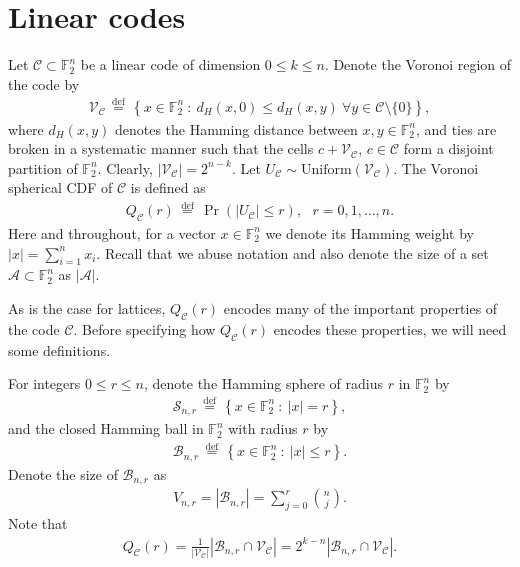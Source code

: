 \documentclass[article,doublecolumn]{IEEEtran}
\newcommand{\F}{{\mathbb{F}}}
\newcommand{\df}{{\, \stackrel{\mathrm{def}}{=}\, }}
\newcommand{\BB}{{\mathcal{B}}}
\newcommand{\SSS}{{\mathcal{S}}}
\newcommand{\AAA}{{\mathcal{A}}}
\newcommand{\CC}{{\mathcal{C}}}
\newcommand{\Unif}{\mathrm{Uniform}}
\newcommand{\VC}{\mathcal{V}_{\mathcal{C}}}
\begin{document}
\section{Linear codes}
\label{sec:linearcodes}

Let $\CC\subset\F_2^n$ be a linear code of dimension $0\leq k\leq n$. Denote the Voronoi region of the code by
\begin{align}
\VC\df\left\{x\in\F_2^n~:~d_H(x,0)\leq d_H(x,y)~ \forall y\in\CC\setminus\{0\} \right\},
\end{align}
where $d_H(x,y)$ denotes the Hamming distance between $x,y\in\F_2^n$, and ties are broken in a systematic manner such that the cells $c+\VC$, $c\in\CC$ form a disjoint partition of $\F_2^n$. Clearly, $|\VC|=2^{n-k}$. Let $U_\CC\sim\Unif(\VC)$. The Voronoi spherical CDF of $\CC$ is defined as
\begin{align}
Q_\CC(r)\df \Pr(|U_\CC|\leq r),~~~r=0,1,\ldots,n.    
\end{align}
Here and throughout, for a vector $x\in\F_2^n$ we denote its Hamming weight by $|x|=\sum_{i=1}^n x_i$. Recall that we abuse notation and also denote the size of a set $\AAA\subset\F_2^n$ as $|\AAA|$.


As is the case for lattices, $Q_\CC(r)$ encodes many of the important properties of the code $\CC$. Before specifying how $Q_{\CC}(r)$ encodes these properties, we will need some definitions.

For integers $0\leq r\leq n$, denote the Hamming sphere of radius $r$ in $\F_2^n$ by
\begin{align}
\SSS_{n,r}\df\left\{x\in \F_2^n~:~|x|= r \right\},    
\end{align}
and the closed Hamming ball in $\F_2^n$ with radius $r$ by
\begin{align}
\BB_{n,r}\df\left\{x\in \F_2^n~:~|x|\leq r \right\}.    
\end{align}
Denote the size of $\BB_{n,r}$ as
\begin{align}
V_{n,r}=|\BB_{n,r}|=\sum_{j=0}^r {{n}\choose{j}}  .  
\end{align}
Note that
\begin{align}
Q_\CC(r)=\frac{1}{|\VC|}\left| \BB_{n,r}\cap \VC\right|=2^{k-n}\left| \BB_{n,r}\cap \VC\right|.   
\label{eq:QasIntersecVol}
\end{align}
\end{document}
